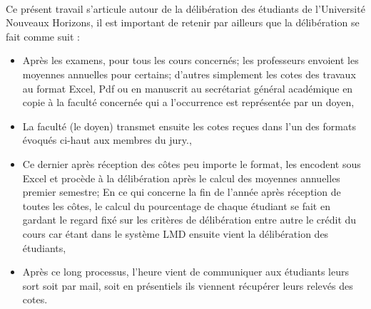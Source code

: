 \begingroup
\paragraph{}
 Ce présent travail s'articule autour de la délibération des étudiants de l'Université Nouveaux Horizons, il est important de retenir par ailleurs que la délibération se fait comme suit :
 \begin{itemize}
 	\item[\labelitemii] Après les examens, pour tous les cours concernés; les professeurs envoient les moyennes annuelles pour certains; d’autres simplement les cotes des travaux au format Excel, Pdf ou en manuscrit au secrétariat général académique en copie à la faculté concernée qui a l'occurrence est représentée par un doyen,
 	\item[\labelitemii] La faculté (le doyen) transmet ensuite les cotes reçues dans l’un des formats évoqués ci-haut aux membres du jury.,
 	\item[\labelitemii] Ce dernier après réception des côtes peu importe le format, les encodent sous Excel et procède à la délibération après le calcul des moyennes annuelles premier semestre; En ce qui concerne la fin de l'année après réception de toutes les côtes, le calcul du pourcentage de chaque étudiant se fait en gardant le regard fixé sur les critères de délibération entre autre le crédit du cours car étant dans le système LMD ensuite vient la délibération des étudiants,
 	\item[\labelitemii] Après ce long processus, l'heure vient de communiquer aux étudiants leurs sort soit par mail, soit en présentiels ils viennent récupérer leurs relevés des cotes.
 \end{itemize} 

\endgroup
